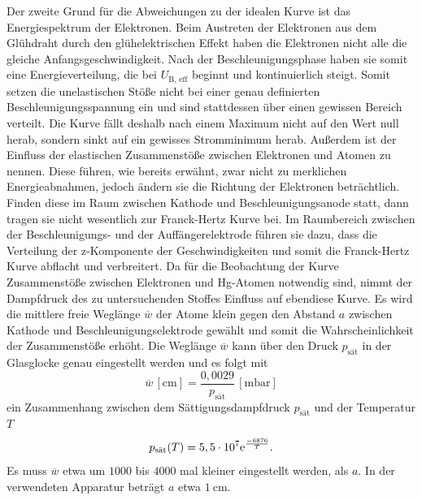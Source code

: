\noindent
Der zweite Grund für die Abweichungen zu der idealen Kurve ist das Energiespektrum der Elektronen. Beim Austreten der Elektronen aus dem Glühdraht durch den glühelektrischen Effekt haben die Elektronen nicht alle die gleiche Anfangsgeschwindigkeit.
Nach der Beschleunigungsphase haben sie somit eine Energieverteilung, die bei $U_{\text{B, eff}}$ beginnt und kontinuierlich steigt. Somit setzen die unelastischen Stöße nicht bei einer genau definierten Beschleunigungsspannung ein und sind stattdessen über einen gewissen Bereich verteilt.
Die Kurve fällt deshalb nach einem Maximum nicht auf den Wert null herab, sondern sinkt auf ein gewisses Stromminimum herab. \newline
Außerdem ist der Einfluss der elastischen Zusammenstöße zwischen Elektronen und Atomen zu nennen. Diese führen, wie bereits erwähnt, zwar nicht zu merklichen Energieabnahmen, jedoch ändern sie die Richtung der Elektronen beträchtlich.
Finden diese im Raum zwischen Kathode und Beschleunigungsanode statt, dann tragen sie nicht wesentlich zur Franck-Hertz Kurve bei. Im Raumbereich zwischen der Beschleunigungs- und der Auffängerelektrode führen sie dazu, dass die Verteilung der z-Komponente der Geschwindigkeiten und somit die Franck-Hertz Kurve abflacht und verbreitert. \newline
Da für die Beobachtung der Kurve Zusammenstöße zwischen Elektronen und Hg-Atomen notwendig sind, nimmt der Dampfdruck des zu untersuchenden Stoffes Einfluss auf ebendiese Kurve.
Es wird die mittlere freie Weglänge $\overline w$ der Atome klein gegen den Abstand $a$ zwischen Kathode und Beschleunigungselektrode gewählt und somit die Wahrscheinlichkeit der Zusammenstöße erhöht. Die Weglänge $\overline w$ kann über den Druck $p_{\text{sät}}$
in der Glasglocke genau eingestellt werden und es folgt mit
\begin{equation}
    \overline w \, [\si{\centi\meter}] = \frac{0,0029}{p_{\text{sät}}} \, [\si{\milli\bar}]
    \label{eqn:w1}
\end{equation}
ein Zusammenhang zwischen dem Sättigungsdampfdruck $p_{\text{sät}}$ und der Temperatur $T$
\begin{equation}
    p_{\text{sät}}(T) = 5,5\cdot 10^{7} \text e^{\frac{-6876}{T}}.
    \label{eqn:p1}
\end{equation}
Es muss $\overline w$ etwa um $1000$ bis $4000$ mal kleiner eingestellt werden, als $a$. In der verwendeten Apparatur beträgt $a$ etwa $\SI{1}{\centi\meter}$.
